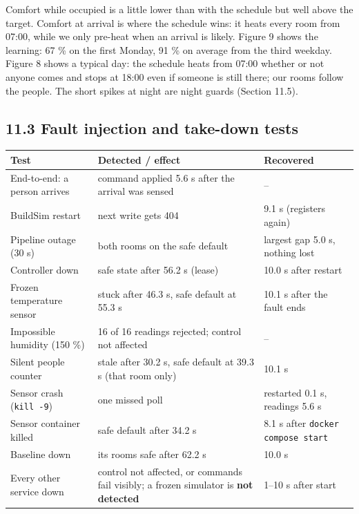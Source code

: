 \documentclass[11pt]{article}
\begin{document}
Comfort while occupied is a little lower than with the schedule but well above the target.
Comfort at arrival is where the schedule wins: it heats every room from 07:00, while we only
pre-heat when an arrival is likely. Figure 9 shows the learning: 67 \% on the first Monday, 91 \%
on average from the third weekday. Figure 8 shows a typical day: the schedule heats from 07:00
whether or not anyone comes and stops at 18:00 even if someone is still there; our rooms follow
the people. The short spikes at night are night guards (Section 11.5).

\subsection{11.3 Fault injection and take-down tests}

\begin{longtable}{@{}L{0.27}L{0.43}L{0.3}@{}}
\toprule
\textbf{Test} & \textbf{Detected / effect} & \textbf{Recovered} \\
\midrule
\endhead
\bottomrule
\endlastfoot
End-to-end: a person arrives & command applied 5.6 s after the arrival was sensed & -- \\
BuildSim restart & next write gets 404 & 9.1 s (registers again) \\
Pipeline outage (30 s) & both rooms on the safe default & largest gap 5.0 s, nothing lost \\
Controller down & safe state after 56.2 s (lease) & 10.0 s after restart \\
Frozen temperature sensor & stuck after 46.3 s, safe default at 55.3 s & 10.1 s after the fault ends \\
Impossible humidity (150 \%) & 16 of 16 readings rejected; control not affected & -- \\
Silent people counter & stale after 30.2 s, safe default at 39.3 s (that room only) & 10.1 s \\
Sensor crash (\texttt{kill -9}) & one missed poll & restarted 0.1 s, readings 5.6 s \\
Sensor container killed & safe default after 34.2 s & 8.1 s after \texttt{docker compose start} \\
Baseline down & its rooms safe after 62.2 s & 10.0 s \\
Every other service down & control not affected, or commands fail visibly; a frozen simulator is \textbf{not detected} & 1--10 s after start \\
\end{longtable}
\end{document}
